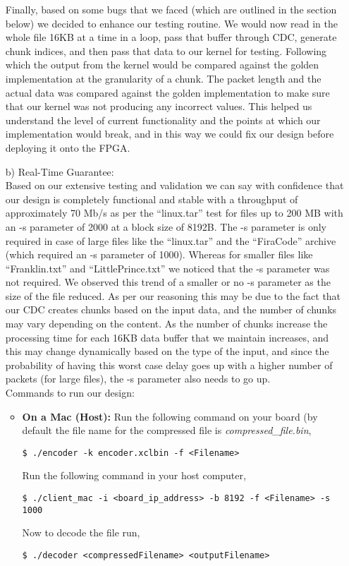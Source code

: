 \documentclass[../main.tex]{subfiles}
\begin{document}
\begin{enumerate}
Finally, based on some bugs that we faced (which are outlined in the section below) we decided to enhance our testing routine. We would now read in the whole file 16KB at a time in a loop, pass that buffer through CDC, generate chunk indices, and then pass that data to our kernel for testing. Following which the output from the kernel would be compared against the golden implementation at the granularity of a chunk. The packet length and the actual data was compared against the golden implementation to make sure that our kernel was not producing any incorrect values. This helped us understand the level of current functionality and the points at which our implementation would break, and in this way we could fix our design before deploying it onto the FPGA.

\item[b)] Real-Time Guarantee:\\
Based on our extensive testing and validation we can say with confidence that our design is completely functional and stable with a throughput of approximately 70 Mb/s as per the “linux.tar” test for files up to 200 MB with an -s parameter of 2000 at a block size of 8192B. The -s parameter is only required in case of large files like the “linux.tar” and the “FiraCode” archive (which required an -s parameter of 1000). Whereas for smaller files like “Franklin.txt” and “LittlePrince.txt” we noticed that the -s parameter was not required. We observed this trend of a smaller or no -s parameter as the size of the file reduced. As per our reasoning this may be due to the fact that our CDC creates chunks based on the input data, and the number of chunks may vary depending on the content. As the number of chunks increase the processing time for each 16KB data buffer that we maintain increases, and this may change dynamically based on the type of the input, and since the probability of having this worst case delay goes up with a higher number of packets (for large files), the -s parameter also needs to go up. \\

    Commands to run our design:
    \begin{itemize}
        \item \textbf{On a Mac (Host):}
            Run the following command on your board (by default the file name for the compressed file is \textit{compressed\_file.bin},
            \begin{verbatim}
$ ./encoder -k encoder.xclbin -f <Filename>
            \end{verbatim}
            Run the following command in your host computer,
            \begin{verbatim}
$ ./client_mac -i <board_ip_address> -b 8192 -f <Filename> -s 1000
            \end{verbatim}
            Now to decode the file run,
            \begin{verbatim}
$ ./decoder <compressedFilename> <outputFilename>
            \end{verbatim}


\end{itemize}
\end{enumerate}
\end{document}
